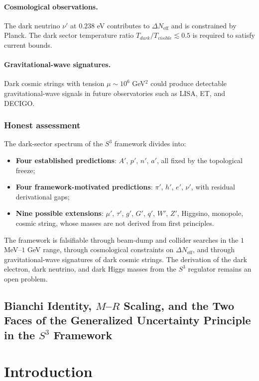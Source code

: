 \documentclass[12pt,oneside,openany]{book}
\begin{document}
\paragraph{Cosmological observations.}
The dark neutrino $\nu'$ at $0.238$ eV contributes to
$\Delta N_{\text{eff}}$ and is constrained by Planck. The dark
sector temperature ratio $T_{dark}/T_{visible}\lesssim 0.5$ is
required to satisfy current bounds.

\paragraph{Gravitational-wave signatures.}
Dark cosmic strings with tension $\mu\sim 10^{6}$ GeV$^{2}$ could
produce detectable gravitational-wave signals in future
observatories such as LISA, ET, and DECIGO.

\subsubsection{Honest assessment}

The dark-sector spectrum of the $S^{3}$ framework divides into:
\begin{itemize}
\item \textbf{Four established predictions}: $A'$, $p'$, $n'$,
$a'$, all fixed by the topological freeze;
\item \textbf{Four framework-motivated predictions}: $\pi'$,
$h'$, $e'$, $\nu'$, with residual derivational gaps;
\item \textbf{Nine possible extensions}: $\mu'$, $\tau'$, $g'$,
$G'$, $q'$, $W'$, $Z'$, Higgsino, monopole, cosmic string, whose
masses are not derived from first principles.
\end{itemize}
The framework is falsifiable through beam-dump and collider
searches in the $1$ MeV--$1$ GeV range, through cosmological
constraints on $\Delta N_{\text{eff}}$, and through
gravitational-wave signatures of dark cosmic strings. The
derivation of the dark electron, dark neutrino, and dark Higgs
masses from the $S^{3}$ regulator remains an open problem.


\subsection{Bianchi Identity, $M$--$R$ Scaling, and the Two Faces of the Generalized Uncertainty Principle in the $S^{3}$ Framework}


\section{Introduction}
\end{document}
